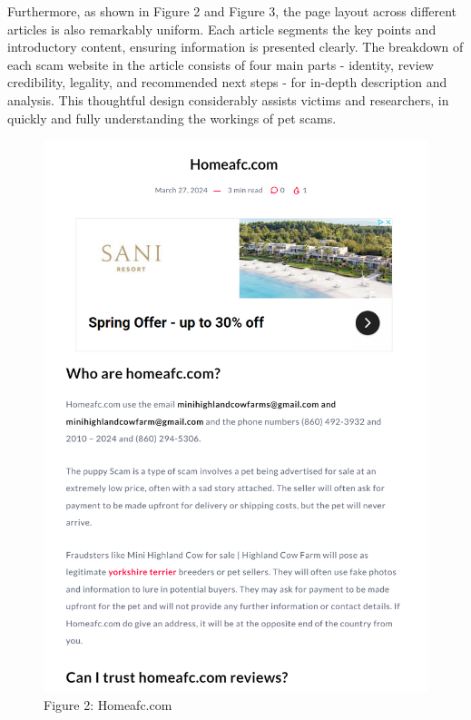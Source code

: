 \documentclass[ oneside,%
                    author={Cassie Qing Tang},
                    degree={BSc},
                     title={An Automated Response System for Disrupting Online Pet Scamming \\ },
                    subtitle={ }]{dissertation}
\begin{document}
Furthermore, as shown in Figure 2 and Figure 3, the page layout across different articles is also remarkably uniform. Each article segments the key points and introductory content, ensuring information is presented clearly. The breakdown of each scam website in the article consists of four main parts - identity, review credibility, legality, and recommended next steps - for in-depth description and analysis. This thoughtful design considerably assists victims and researchers, in quickly and fully understanding the workings of pet scams.
\begin{figure}[H]
    \centering
    \begin{minipage}{0.45\textwidth}\ContinuedFloat
        \includegraphics[width=\linewidth]{pic/figure2.png}
        \caption{Figure 2: Homeafc.com}
        \label{fig:pic2}
    \end{minipage}
    \hfill

\end{figure}
\end{document}
